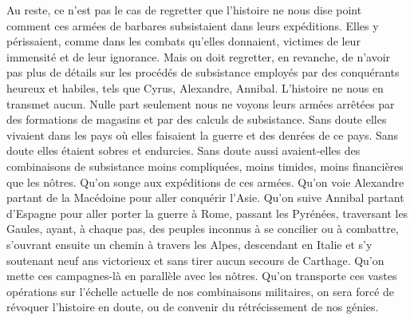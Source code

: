 \documentclass[french,twoside]{book} %
\begin{document}
Au reste, ce n’est pas le cas de regretter que l’histoire ne nous dise point comment ces armées de barbares subsistaient dans leurs expéditions. Elles y périssaient, comme dans les combats qu’elles donnaient, victimes de leur immensité et de leur ignorance. Mais on doit regretter, en revanche, de n’avoir pas plus de détails sur les procédés de subsistance employés par des conquérants heureux et habiles, tels que Cyrus, Alexandre, Annibal. L’histoire ne nous en transmet aucun. Nulle part seulement nous ne voyons leurs armées arrêtées par des formations de magasins et par des calculs de subsistance. Sans doute elles vivaient dans les pays où elles faisaient la guerre et des denrées de ce pays. Sans doute elles étaient sobres et endurcies. Sans doute aussi avaient-elles des combinaisons de subsistance moins compliquées, moins timides, moins financières que les nôtres. Qu’on songe aux expéditions de ces armées. Qu’on voie Alexandre partant de la Macédoine pour aller conquérir l’Asie. Qu’on suive Annibal partant d’Espagne pour aller porter la guerre à Rome, passant les Pyrénées, traversant les Gaules, ayant, à chaque pas, des peuples inconnus à se concilier ou à combattre, s’ouvrant ensuite un chemin à travers les Alpes, descendant en Italie et s’y soutenant neuf ans victorieux et sans tirer aucun secours de Carthage. Qu’on mette ces campagnes-là en parallèle avec les nôtres. Qu’on transporte ces vastes opérations sur l’échelle actuelle de nos combinaisons militaires, on sera forcé de révoquer l’histoire en doute, ou de convenir du rétrécissement de nos génies.\par
\end{document}
